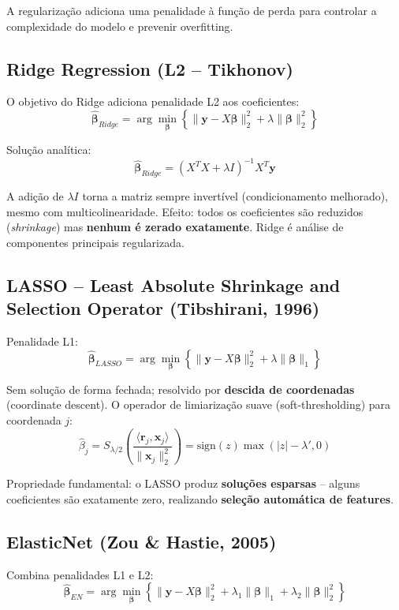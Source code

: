 \documentclass[12pt,a4paper]{article}
\begin{document}
A regularização adiciona uma penalidade à função de perda para controlar a complexidade do modelo e prevenir overfitting.

\subsection{Ridge Regression (L2 -- Tikhonov)}

O objetivo do Ridge adiciona penalidade L2 aos coeficientes:
\[
  \hat{\boldsymbol{\beta}}_{Ridge} = \arg\min_{\boldsymbol{\beta}} \left\{ \|\mathbf{y} - X\boldsymbol{\beta}\|_2^2 + \lambda\|\boldsymbol{\beta}\|_2^2 \right\}
\]

Solução analítica:
\[
  \hat{\boldsymbol{\beta}}_{Ridge} = (X^TX + \lambda I)^{-1}X^T\mathbf{y}
\]

A adição de $\lambda I$ torna a matriz sempre invertível (condicionamento melhorado), mesmo com multicolinearidade. Efeito: todos os coeficientes são reduzidos (\textit{shrinkage}) mas \textbf{nenhum é zerado exatamente}. Ridge é análise de componentes principais regularizada.

\subsection{LASSO -- Least Absolute Shrinkage and Selection Operator (Tibshirani, 1996)}

Penalidade L1:
\[
  \hat{\boldsymbol{\beta}}_{LASSO} = \arg\min_{\boldsymbol{\beta}} \left\{ \|\mathbf{y} - X\boldsymbol{\beta}\|_2^2 + \lambda\|\boldsymbol{\beta}\|_1 \right\}
\]

Sem solução de forma fechada; resolvido por \textbf{descida de coordenadas} (coordinate descent). O operador de limiarização suave (soft-thresholding) para coordenada $j$:
\[
  \hat{\beta}_j = S_{\lambda/2}\left(\frac{\langle \mathbf{r}_j, \mathbf{x}_j \rangle}{\|\mathbf{x}_j\|_2^2}\right) = \text{sign}(z) \max(|z| - \lambda', 0)
\]

Propriedade fundamental: o LASSO produz \textbf{soluções esparsas} -- alguns coeficientes são exatamente zero, realizando \textbf{seleção automática de features}.

\subsection{ElasticNet (Zou \& Hastie, 2005)}

Combina penalidades L1 e L2:
\[
  \hat{\boldsymbol{\beta}}_{EN} = \arg\min_{\boldsymbol{\beta}} \left\{ \|\mathbf{y} - X\boldsymbol{\beta}\|_2^2 + \lambda_1\|\boldsymbol{\beta}\|_1 + \lambda_2\|\boldsymbol{\beta}\|_2^2 \right\}
\]
\end{document}
